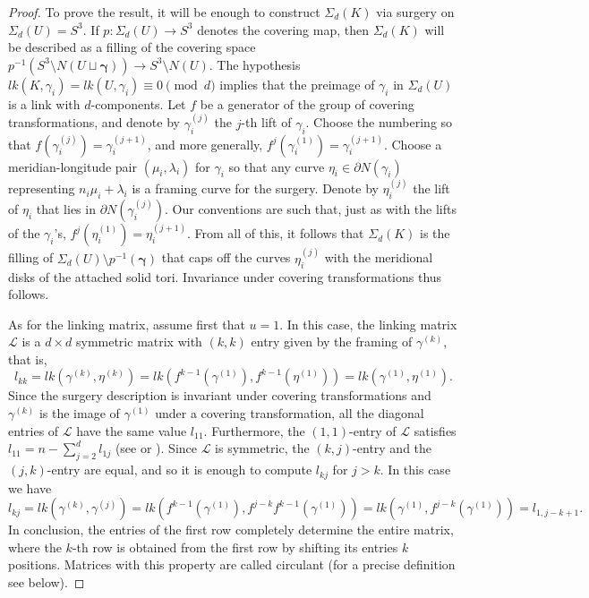 \documentclass[11pt]{amsart}
\begin{document}
\begin{proof} To prove the result, it will be enough to construct $\Sigma_d(K)$ via surgery on $\Sigma_d(U)=S^3$. If $p:\Sigma_d(U)\to S^3$ denotes the covering map, then $\Sigma_d(K)$ will be described as a filling of the covering space $p^{-1}\left(S^3\setminus N(U\sqcup \boldsymbol\gamma)\right)\to S^3\setminus N(U)$. The hypothesis $lk(K,\gamma_i)=lk(U,\gamma_i)\equiv 0 \pmod{d}$ implies that the preimage of $\gamma_i$ in $\Sigma_d(U)$ is a link with $d$-components. Let $f$ be a generator of the group of covering transformations, and denote by $\gamma^{(j)}_i$ the $j$-th lift of $\gamma_i$. Choose the numbering so that $f\left(\gamma^{(j)}_i\right)=\gamma^{(j+1)}_i$, and more generally, $f^j\left(\gamma^{(1)}_i\right)=\gamma^{(j+1)}_i$. Choose a meridian-longitude pair $(\mu_i,\lambda_i)$ for $\gamma_i$ so that any curve $\eta_i\in\partial N(\gamma_i)$ representing  $n_i\mu_i+\lambda_i$ is a framing curve for the surgery.  Denote by $\eta_i^{(j)}$ the lift of $\eta_i$ that lies in $\partial N\left(\gamma^{(j)}_i\right)$. Our conventions are such that, just as with the lifts of the $\gamma_i$'s, $f^j\left(\eta^{(1)}_i\right)=\eta^{(j+1)}_i$. From all of this, it follows that $\Sigma_d(K)$ is the filling of $\Sigma_d(U)\setminus p^{-1}(\boldsymbol\gamma)$ that caps off the curves $\eta_i^{(j)}$ with the meridional disks of the attached solid tori. Invariance under covering transformations thus follows.

As for the linking matrix, assume first that $u=1$. In this case, the linking matrix $\mathcal{L}$ is a $d\times d$ symmetric matrix with $(k,k)$ entry given by the framing of $\gamma^{(k)}$, that is,
\begin{equation}
l_{kk}=lk(\gamma^{(k)},\eta^{(k)})=lk(f^{k-1}\left(\gamma^{(1)}\right),f^{k-1}\left(\eta^{(1)}\right))=lk(\gamma^{(1)},\eta^{(1)}).
\end{equation}
Since the surgery description is invariant under covering transformations and $\gamma^{(k)}$ is the image of $\gamma^{(1)}$ under a covering transformation, all the diagonal entries of $\mathcal{L}$ have the same value $l_{11}$. Furthermore, the $(1,1)$-entry of $\mathcal{L}$ satisfies $l_{11}=n-\sum_{j=2}^d l_{1j}$ (see \cite[Lemma 2.3]{homo} or \cite[pg. 140]{faces}).
Since $\mathcal{L}$ is symmetric, the $(k,j)$-entry and the $(j,k)$-entry are equal, and so it is enough to compute $l_{kj}$ for $j>k$. In this case we have $$l_{kj}
=lk\left(\gamma^{(k)},\gamma^{(j)}\right)=lk\left(f^{k-1}\left(\gamma^{(1)}\right),f^{j-k}f^{k-1}\left(\gamma^{(1)}\right)\right)=lk\left(\gamma^{(1)},f^{j-k}\left(\gamma^{(1)}\right)\right)=l_{1,j-k+1}
.$$ 
In conclusion, the entries of the first row completely determine the entire matrix, where the $k$-th row is obtained from the first row by shifting its entries $k$ positions. Matrices with this property are called circulant (for a precise definition see  below).


\end{proof}
\end{document}
